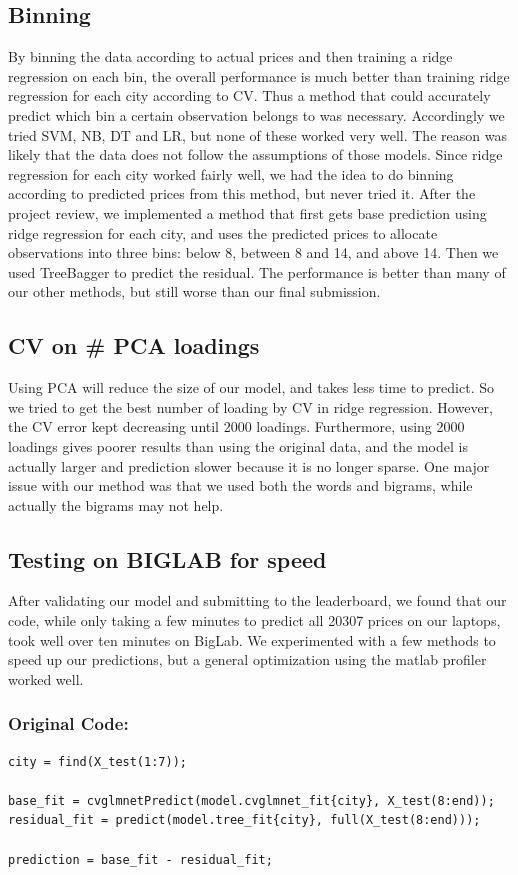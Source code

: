 \documentclass[11pt]{article}
\begin{document}
\subsection{Binning}
By binning the data according to actual prices and then training a ridge regression on each bin, the overall performance is much better than training ridge regression for each city according to CV. Thus a method that could accurately predict which bin a certain observation belongs to was necessary. Accordingly we tried SVM, NB, DT and LR, but none of these worked very well. The reason was likely that the data does not follow the assumptions of those models. Since ridge regression for each city worked fairly well, we had the idea to do binning according to predicted prices from this method, but never tried it. After the project review, we implemented a method that first gets base prediction using ridge regression for each city, and uses the predicted prices to allocate observations into three bins: below 8, between 8 and 14, and above 14. Then we used TreeBagger to predict the residual. The performance is better than many of our other methods, but still worse than our final submission.

\subsection{CV on \# PCA loadings}
Using PCA will reduce the size of our model, and takes less time to predict. So we tried to get the best number of loading by CV in ridge regression. However, the CV error kept decreasing until 2000 loadings. Furthermore, using 2000 loadings gives poorer results than using the original data, and the model is actually larger and prediction slower because it is no longer sparse. One major issue with our method was that we used both the words and bigrams, while actually the bigrams may not help.

\subsection{Testing on BIGLAB for speed}
After validating our model and submitting to the leaderboard, we found that our code, while only taking a few minutes to predict all 20307 prices on our laptops, took well over ten minutes on BigLab. We experimented with a few methods to speed up our predictions, but a general optimization using the matlab profiler worked well.
\subsubsection*{Original Code:}
\begin{lstlisting}
city = find(X_test(1:7));

base_fit = cvglmnetPredict(model.cvglmnet_fit{city}, X_test(8:end));
residual_fit = predict(model.tree_fit{city}, full(X_test(8:end)));

prediction = base_fit - residual_fit;
\end{lstlisting}
\end{document}
